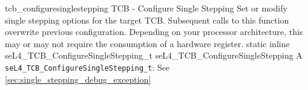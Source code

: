 %
%
%
%

\apidoc
{tcb_configuresinglestepping}
{TCB - Configure Single Stepping}
{Set or modify single stepping options for the target TCB. Subsequent calls to this
function overwrite previous configuration. Depending on your processor architecture,
this may or may not require the consumption of a hardware register.}
{static inline seL4\_TCB\_ConfigureSingleStepping\_t seL4\_TCB\_ConfigureSingleStepping}
{
}
{A \texttt{seL4\_TCB\_ConfigureSingleStepping\_t}: \tcbconfiguresinglesteppingtdesc}
{See \autoref{sec:single_stepping_debug_exception}}
